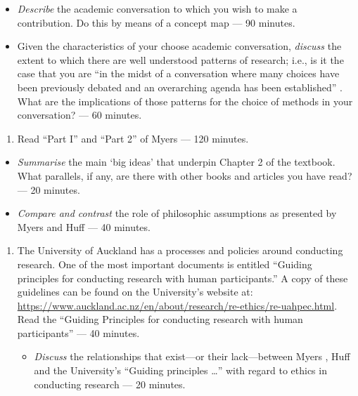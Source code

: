 \documentclass[]{book}
\providecommand{\tightlist}{%
  \setlength{\itemsep}{0pt}\setlength{\parskip}{0pt}}
\theoremstyle{definition}
\theoremstyle{definition}
\theoremstyle{definition}
\theoremstyle{remark}
\begin{document}
\begin{itemize}
\item
  \emph{Describe} the academic conversation to which you wish to make a
  contribution. Do this by means of a concept map --- 90 minutes.
\item
  Given the characteristics of your choose academic conversation,
  \emph{discuss} the extent to which there are well understood patterns
  of research; i.e., is it the case that you are ``in the midst of a
  conversation where many choices have been previously debated and an
  overarching agenda has been established'' \autocite[
  p.~87]{huff_2009_designingresearchpublication}. What are the
  implications of those patterns for the choice of methods in your
  conversation? --- 60 minutes.
\end{itemize}

\begin{enumerate}
\def\labelenumi{\arabic{enumi}.}
\setcounter{enumi}{2}
\tightlist
\item
  Read ``Part I'' and ``Part 2'' of Myers \autocite*[
  p.~3--56]{myers_2013_qualitativeresearchbusiness} --- 120 minutes.
\end{enumerate}

\begin{itemize}
\item
  \emph{Summarise} the main `big ideas' that underpin Chapter 2 of the
  textbook. What parallels, if any, are there with other books and
  articles you have read? --- 20 minutes.
\item
  \emph{Compare and contrast} the role of philosophic assumptions as
  presented by Myers \autocite*{myers_2013_qualitativeresearchbusiness}
  and Huff \autocite*{huff_2009_designingresearchpublication} --- 40
  minutes.
\end{itemize}

\begin{enumerate}
\def\labelenumi{\arabic{enumi}.}
\setcounter{enumi}{3}
\item
  The University of Auckland has a processes and policies around
  conducting research. One of the most important documents is entitled
  ``Guiding principles for conducting research with human
  participants.'' A copy of these guidelines can be found on the
  University's website at:
  \url{https://www.auckland.ac.nz/en/about/research/re-ethics/re-uahpec.html}.
  Read the ``Guiding Principles for conducting research with human
  participants''
  \autocite{theuniversityofauckland_2013_guidingprinciplesconducting}
  --- 40 minutes.

  \begin{itemize}
  \tightlist
  \item
    \emph{Discuss} the relationships that exist---or their
    lack---between Myers
    \autocite*{myers_2013_qualitativeresearchbusiness}, Huff
    \autocite*{huff_2009_designingresearchpublication} and the
    University's ``Guiding principles \ldots{}'' with regard to ethics
    in conducting research --- 20 minutes.
  \end{itemize}
\end{enumerate}
\end{document}
